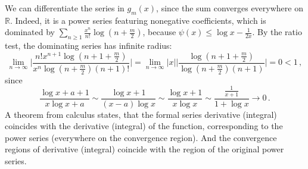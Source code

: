 \documentclass[a4paper,10pt]{article}
\begin{document}
We can differentiate the series in $g_m(x)$, since the sum converges everywhere
on $\mathbb{R}$. Indeed, it is a power series featuring nonegative coefficients,
which is dominated by $
  \sum_{n \geq 1} \tfrac{x^n}{n!} \log{(n+\tfrac{m}2)}
$, because $\psi(x)\leq \log x - \tfrac1{2x}$. By the ratio test, the dominating
series has infinite radius:
$$
\lim_{n\to\infty}
  \biggl\lvert
    \frac{
      n! x^{n+1} \log{(n + 1 + \tfrac{m}2)}
    }{
      x^n \log{(n + \tfrac{m}2)} (n+1)!
    }
  \biggr\rvert
  = \lim_{n\to\infty}
    \lvert x \rvert 
    \biggl\lvert
      \frac{
        \log{(n + 1 + \tfrac{m}2)}
      }{
        \log{(n + \tfrac{m}2)} (n+1)
      }
    \biggr\rvert
  = 0 < 1
  \,, $$
since
$$
\frac{\log{x + a + 1}}{x \log{x + a}}
  \sim \frac{\log{x+1}}{(x-a) \log{x}}
  \sim \frac{\log{x+1}}{x \log{x}}
  \sim \frac{\tfrac1{x+1}}{1 + \log{x}}
  \to 0
  \,. $$
A theorem from calculus states, that the formal series derivative (integral)
coincides with the derivative (integral) of the function, corresponding to
the power series (everywhere on the convergence region). And the convergence
regions of derivative (integral) coincide with the region of the original
power series.
\end{document}
